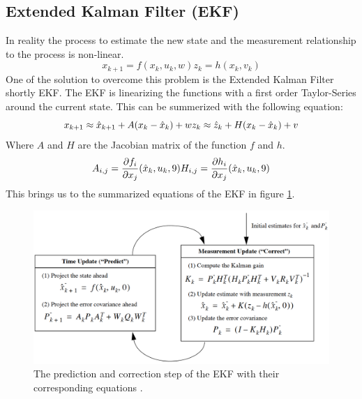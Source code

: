 \subsection*{Extended Kalman Filter (EKF)}\label{ekf}
In reality the process to estimate the new state and the measurement relationship to the process is non-linear.
\begin{equation}
x_{k+1}=f(x_k,u_k,w)
z_k=h(x_k,v_k)
\end{equation}
One of the solution to overcome this problem is the Extended Kalman Filter shortly EKF. The EKF is linearizing the functions with a first order Taylor-Series around the current state. This can be summerized with the following equation:
\begin{equation}
x_{k+1}\approx \hat{x}_{k+1}+A(x_k-\hat{x}_k)+w\\
z_k\approx \hat{z}_k+H(x_k-\hat{x}_k) +v 
\end{equation}
Where $A$ and $H$ are the Jacobian matrix of the function $f$ and $h$.
\begin{equation}
A_{i,j}=\frac{\partial f_{i}}{\partial x_j}(\hat{x}_k,u_k,9)\\
H_{i,j}=\frac{\partial h_{i}}{\partial x_j}(\hat{x}_k,u_k,9)
\end{equation}
This brings us to the summarized equations of the EKF in figure \ref{equation_ekf}.
\begin{figure}[h]
\begin{center}
\includegraphics[width=13cm]{pictures/equation_ekf.png}
\caption{The prediction and correction step of the EKF with their corresponding equations \cite{welch1997}. }
\label{equation_ekf}
\end{center}
\end{figure}



